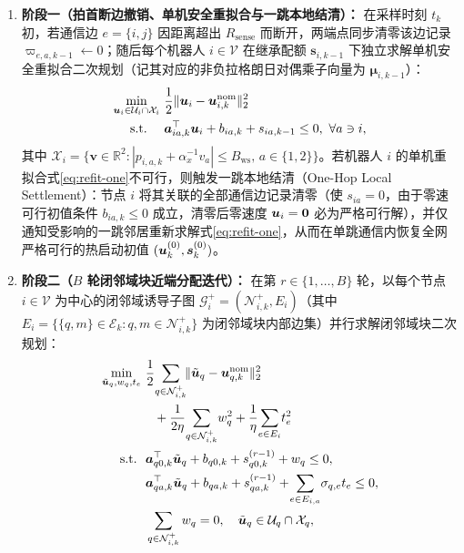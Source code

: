 \begin{enumerate}
 \item \textbf{阶段一（拍首断边撤销、单机安全重拟合与一跳本地结清）：} 在采样时刻 $t_k$ 初，若通信边 $e=\{i,j\}$ 因距离超出 $R_{\mathrm{sense}}$ 而断开，两端点同步清零该边记录 $\varpi_{e,a,k-1}\leftarrow 0$；随后每个机器人 $i\in\mathcal V$ 在继承配额 $\boldsymbol s_{i,k-1}$ 下独立求解单机安全重拟合二次规划（记其对应的非负拉格朗日对偶乘子向量为 $\boldsymbol\mu_{i,k-1}$）：
 \begin{equation}
\begin{split}
  \min_{\bu_i\in\mathcal U_i\cap\mathcal X_i}&\ \frac12\norm{\bu_i-\bu_{i,k}^{\mathrm{nom}}}_2^2\\
  \text{s.t.}\quad&\ \boldsymbol a_{ia,k}^{\top}\bu_i+b_{ia,k}+s_{ia,k-1}\le 0,\ \forall a\ni i,
\end{split}
  \label{eq:refit-one}
 \end{equation}
 其中 $\mathcal X_i=\{\boldsymbol v\in\mathbb R^2:|p_{i,a,k}+\alpha_x^{-1}v_a|\le B_{\mathrm{ws}},\,a\in\{1,2\}\}$。若机器人 $i$ 的单机重拟合式\eqref{eq:refit-one}不可行，则触发一跳本地结清（One-Hop Local Settlement）：节点 $i$ 将其关联的全部通信边记录清零（使 $s_{ia}=0$，由于零速可行初值条件 $b_{ia,k}\le 0$ 成立，清零后零速度 $\boldsymbol{u}_i=\boldsymbol 0$ 必为严格可行解），并仅通知受影响的一跳邻居重新求解式\eqref{eq:refit-one}，从而在单跳通信内恢复全网严格可行的热启动初值 $(\boldsymbol{u}_k^{(0)},\boldsymbol s_k^{(0)})$。
 \item \textbf{阶段二（$B$ 轮闭邻域块近端分配迭代）：} 在第 $r\in\{1,\dots,B\}$ 轮，以每个节点 $i\in\mathcal V$ 为中心的闭邻域诱导子图 $\mathcal G_i^+=(\mathcal N_{i,k}^+,E_i)$（其中 $E_i=\{\{q,m\}\in\mathcal E_k:q,m\in\mathcal N_{i,k}^+\}$ 为闭邻域块内部边集）并行求解闭邻域块二次规划：
 \begin{equation}
 \begin{split}
  \min_{\tilde\bu_q,w_q,t_e}&\ \frac12\!\sum_{q\in\mathcal N_{i,k}^+}\!\norm{\tilde\bu_q-\bu_{q,k}^{\mathrm{nom}}}_2^2\\
  &\quad+\frac{1}{2\eta}\!\sum_{q\in\mathcal N_{i,k}^+}\!w_q^2+\frac{1}{\eta}\!\sum_{e\in E_i}\!t_e^2\\
  \text{s.t.}\ &\ \boldsymbol a_{q0,k}^{\top}\tilde\bu_q+b_{q0,k}+s_{q0,k}^{(r-1)}+w_q\le 0,\\
  &\ \boldsymbol a_{qa,k}^{\top}\tilde\bu_q+b_{qa,k}+s_{qa,k}^{(r-1)}+\!\sum_{e\in E_{i,a}}\!\sigma_{q,e}t_e\le 0,\\
  &\ \sum_{q\in\mathcal N_{i,k}^+}w_q=0,\quad \tilde\bu_q\in\mathcal U_q\cap\mathcal X_q,
 \end{split}\label{eq:block-qp}

\end{equation}
\end{enumerate}
